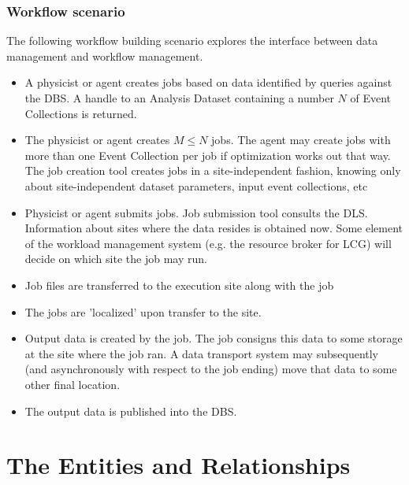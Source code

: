 \documentclass{cmspaper}
\begin{document}
{\subsubsection{Workflow scenario}

The following workflow building scenario explores the 
interface between data management and workflow management.

\begin{itemize}

\item A physicist or agent creates jobs based on data identified by queries against 
the DBS.  A handle to an Analysis Dataset containing a number $N$ of
Event Collections is returned.  

\item The physicist or agent creates $M \le N$ jobs.  The agent may create 
      jobs with more than one Event Collection per job if optimization 
      works out that way.  The job creation tool creates jobs in a 
      site-independent fashion, knowing only about site-independent dataset 
      parameters, input event collections, etc 

\item Physicist or agent submits jobs. Job submission tool consults the DLS. 
      Information about sites where the data resides is obtained now. Some
      element of the workload management system (e.g. the resource broker
      for LCG) will decide on which site the job may run.

\item Job files are transferred to the execution site along with the job 

\item The jobs are 'localized' upon transfer to the site. 

\item Output data is created by the job. The job consigns this data to
      some storage at the site where the job ran. A data transport system
      may subsequently (and asynchronously with respect to the job ending)
      move that data to some other final location.

\item The output data is published into the DBS.

\end{itemize}




\section{The Entities and Relationships}
\label{sec:details}

}
\end{document}
